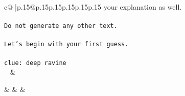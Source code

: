 \documentclass{article}
\begin{document}
{\begin{supertabular}{c@{$\;$}|p{.15\linewidth}@{}p{.15\linewidth}p{.15\linewidth}p{.15\linewidth}p{.15\linewidth}p{.15\linewidth}}
{{{your explanation as well.\\ \tt \\ \tt Do not generate any other text.\\ \tt \\ \tt Let's begin with your first guess.\\ \tt \\ \tt clue: deep ravine\\ \tt  
	  } 
	   } 
	   } 
	 & \\ 
 

    \theutterance {}  

    &  
	 & & \\ 
 

    \theutterance {}  


\end{supertabular}}
\end{document}
